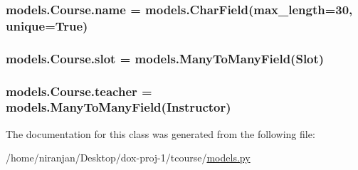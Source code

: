 \subsubsection[{\texorpdfstring{name}{name}}]{\setlength{\rightskip}{0pt plus 5cm}models.\+Course.\+name = models.\+Char\+Field(max\+\_\+length=30, unique=True)\hspace{0.3cm}{\ttfamily [static]}}\hypertarget{classmodels_1_1_course_a4b8a4fdabc8a2f86a43656880362f660}{}\label{classmodels_1_1_course_a4b8a4fdabc8a2f86a43656880362f660}
\subsubsection[{\texorpdfstring{slot}{slot}}]{\setlength{\rightskip}{0pt plus 5cm}models.\+Course.\+slot = models.\+Many\+To\+Many\+Field({\bf Slot})\hspace{0.3cm}{\ttfamily [static]}}\hypertarget{classmodels_1_1_course_a0eeef35d1646b968dae5758f9e3c526a}{}\label{classmodels_1_1_course_a0eeef35d1646b968dae5758f9e3c526a}
\subsubsection[{\texorpdfstring{teacher}{teacher}}]{\setlength{\rightskip}{0pt plus 5cm}models.\+Course.\+teacher = models.\+Many\+To\+Many\+Field({\bf Instructor})\hspace{0.3cm}{\ttfamily [static]}}\hypertarget{classmodels_1_1_course_a2f4f8f2e0bb55a8304baa843f5e0cbc0}{}\label{classmodels_1_1_course_a2f4f8f2e0bb55a8304baa843f5e0cbc0}


The documentation for this class was generated from the following file\+:\begin{DoxyCompactItemize}
\item 
/home/niranjan/\+Desktop/dox-\/proj-\/1/tcourse/\hyperlink{models_8py}{models.\+py}\end{DoxyCompactItemize}
